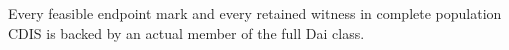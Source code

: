 Every feasible endpoint mark and every retained witness in complete population CDIS is backed by an actual member of the full Dai class.